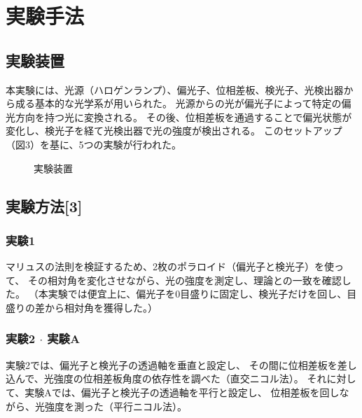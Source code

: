 \documentclass{article}
\begin{document}
\section{実験手法}
\subsection{実験装置}
\begin{spacing}{1.2}
    本実験には、光源（ハロゲンランプ）、偏光子、位相差板、検光子、光検出器から成る基本的な光学系が用いられた。
    光源からの光が偏光子によって特定の偏光方向を持つ光に変換される。
    その後、位相差板を通過することで偏光状態が変化し、検光子を経て光検出器で光の強度が検出される。
    このセットアップ（図3）を基に、5つの実験が行われた。
\end{spacing}
\begin{figure}[!htb] %
    \centering
    \caption{実験装置}
    \label{fig:3}
\end{figure}
\FloatBarrier

\subsection{実験方法[3]}
\subsubsection{実験1}
\begin{spacing}{1.2}
    \noindent %
    マリュスの法則を検証するため、2枚のポラロイド（偏光子と検光子）を使って、
    その相対角を変化させながら、光の強度を測定し、理論との一致を確認した。
    （本実験では便宜上に、偏光子を0目盛りに固定し、検光子だけを回し、目盛りの差から相対角を獲得した。）
\end{spacing}

\subsubsection{実験2 $\cdot$ 実験A}
\begin{spacing}{1.2}
    \noindent %
    実験2では、偏光子と検光子の透過軸を垂直と設定し、
    その間に位相差板を差し込んで、光強度の位相差板角度の依存性を調べた（直交ニコル法）。
    それに対して、実験Aでは、偏光子と検光子の透過軸を平行と設定し、
    位相差板を回しながら、光強度を測った（平行ニコル法）。
\end{spacing}
\end{document}
